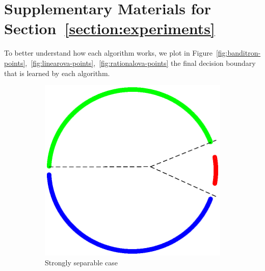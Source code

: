 \section{Supplementary Materials for Section~\ref{section:experiments}}
\label{section:supp-to-experiment}


To better understand how each algorithm works, we plot in
Figure~\ref{fig:banditron-points},~\ref{fig:linearova-points},~\ref{fig:rationalova-points}
the final decision boundary that is learned by each algorithm.

\begin{figure}[h!]
    \centering
    \begin{subfigure}[b]{0.23\textwidth}
        \captionsetup{justification=centering}
        \begin{center}
        \hspace*{-0.3cm} \includegraphics[width=1.15\textwidth, trim={0, 0cm, 0, 0}, clip]{figures/strong_banditron_points}
        \caption{Strongly separable case}
        \end{center}
    \end{subfigure}
    \hfill
    \begin{subfigure}[b]{0.23\textwidth}
        \captionsetup{justification=centering}
        \centering

\end{subfigure}
\end{figure}

